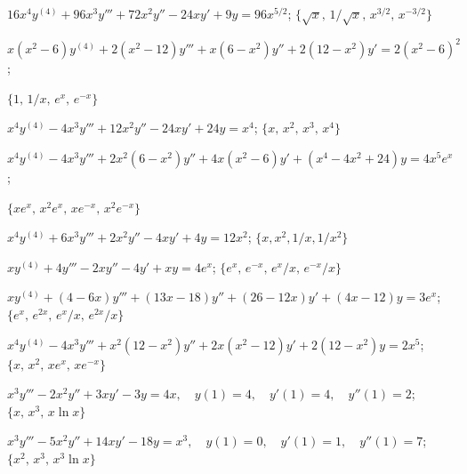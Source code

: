 \begin{exerciselist}
  \item\label{exer:9.4.14} $16x^{4}y^{(4)}+96x^{3}y'''+72x^{2}y''-24xy'+9y=96x^{5/2}$; \quad
        $\{\sqrt{x},\,1/\sqrt{x},\,x^{3/2},\,x^{-3/2}\}$

  \item\label{exer:9.4.15}
        $x(x^{2}-6)y^{(4)}+2(x^{2}-12)y'''+x(6-x^{2})y''+2(12-x^{2})y'=2(x^{2}-6)^{2}$; \quad

  $\{1,\,1/x,\,e^{x},\,e^{-x}\}$

  \item\label{exer:9.4.16} $x^{4}y^{(4)}-4x^{3}y'''+12x^{2}y''-24xy'+24y=x^{4}$; \quad
        $\{x,\,x^{2},\,x^{3},\,x^{4}\}$

  \item\label{exer:9.4.17}
        $x^{4}y^{(4)}-4x^{3}y'''+2x^{2}(6-x^{2})y''+4x(x^{2}-6)y'+(x^{4}-4x^{2}+24)y=4x^{5}e^{x}$;
        \quad

  $\{xe^{x},\,x^{2}e^{x},\,xe^{-x},\,x^{2}e^{-x}\}$

  \item\label{exer:9.4.18} $x^{4}y^{(4)}+6x^{3}y'''+2x^{2}y''-4xy'+4y=12x^{2}$; \quad
        $\{x,x^{2},1/x,1/x^{2}\}$

  \item\label{exer:9.4.19} $xy^{(4)}+4y'''-2xy''-4y'+xy=4e^{x}$; \quad
        $\{e^{x},\,e^{-x},\,e^{x}/x,\,e^{-x}/x\}$

  \item\label{exer:9.4.20} $xy^{(4)}+(4-6x)y'''+(13x-18)y''+(26-12x)y'+(4x-12)y=3e^{x}$; \quad
        $\{e^{x},\,e^{2x},\,e^{x}/x,\,e^{2x}/x\}$

  \item\label{exer:9.4.21}
        $x^{4}y^{(4)}-4x^{3}y'''+x^{2}(12-x^{2})y''+2x(x^{2}-12)y'+2(12-x^{2})y=2x^{5}$;
        $\{x,\,x^{2},\,xe^{x},\,xe^{-x}\}$


  \item\label{exer:9.4.22} \CGex
        $x^{3}y'''-2x^{2}y''+3xy'-3y=4x,\quad y(1)=4,\quad y'(1)=4, \quad y''(1)=2$; \quad
        $\{x,\,x^{3},\,x\ln x\}$

  \item\label{exer:9.4.23}
        $x^{3}y'''-5x^{2}y''+14xy'-18y=x^{3},\quad y(1)=0,\quad y'(1)=1,\quad y''(1)=7$; \quad
        $\{x^{2},\,x^{3},\,x^{3}\ln x\}$


\end{exerciselist}
